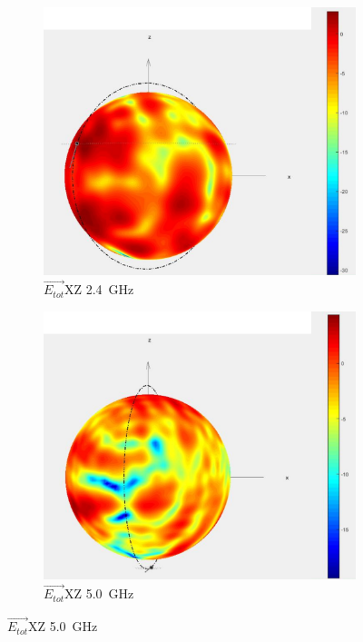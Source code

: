 \begin{figure}[h!]
	\begin{subfigure}[t]{0.35\textwidth}
		\begin{center}
			\includegraphics[width=1\textwidth]{../fig/plt/star_lab_2ghz4_xz_reduced.png}
			\caption{$\vec{E_{tot}}$XZ \SI{2.4}{\giga\hertz}}
		\end{center}
	\end{subfigure}
	\begin{subfigure}[t]{0.35\textwidth}
		\begin{center}
			\includegraphics[width=1\textwidth]{../fig/plt/star_lab_5ghz0_xz_reduced.png}
			\caption{$\vec{E_{tot}}$XZ \SI{5.0}{\giga\hertz}}
		\end{center}
	\end{subfigure}


\end{figure}
